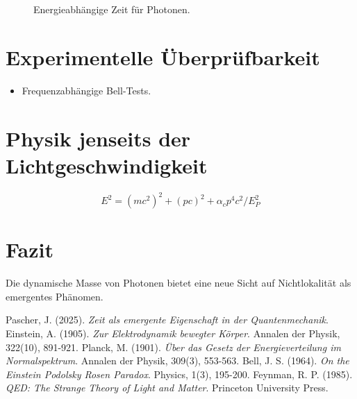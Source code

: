 \documentclass[12pt,a4paper]{article}
\begin{document}
	\begin{figure}[h]
		\centering
		\caption{Energieabhängige Zeit für Photonen.}
	\end{figure}
	
	\section{Experimentelle Überprüfbarkeit}
	\begin{itemize}
		\item Frequenzabhängige Bell-Tests.
	\end{itemize}
	
	\section{Physik jenseits der Lichtgeschwindigkeit}
	\begin{equation}
		E^2 = (mc^2)^2 + (pc)^2 + \alpha_c p^4 c^2 / E_P^2
	\end{equation}
	
	\section{Fazit}
	Die dynamische Masse von Photonen bietet eine neue Sicht auf Nichtlokalität als emergentes Phänomen.
	
	\begin{thebibliography}{5}
		 Pascher, J. (2025). \textit{Zeit als emergente Eigenschaft in der Quantenmechanik}. 
		 Einstein, A. (1905). \textit{Zur Elektrodynamik bewegter Körper}. Annalen der Physik, 322(10), 891-921.
		 Planck, M. (1901). \textit{Über das Gesetz der Energieverteilung im Normalspektrum}. Annalen der Physik, 309(3), 553-563.
		 Bell, J. S. (1964). \textit{On the Einstein Podolsky Rosen Paradox}. Physics, 1(3), 195-200.
		 Feynman, R. P. (1985). \textit{QED: The Strange Theory of Light and Matter}. Princeton University Press.
	\end{thebibliography}
	
\end{document}
